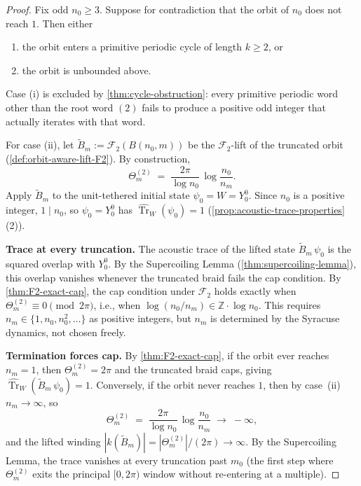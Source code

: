 \documentclass[11pt,a4paper]{article}
\theoremstyle{plain}
\theoremstyle{definition}
\theoremstyle{remark}
\numberwithin{equation}{section}
\newcommand{\Z}{\mathbb{Z}}
\DeclareMathOperator{\Tr}{Tr}
\begin{document}
\begin{proof}
Fix odd $n_0\ge 3$.  Suppose for contradiction that the orbit of
$n_0$ does not reach $1$.  Then either
\begin{enumerate}
  \item[(i)] the orbit enters a primitive periodic cycle of length
        $k\ge 2$, or
  \item[(ii)] the orbit is unbounded above.
\end{enumerate}
Case (i) is excluded by \cref{thm:cycle-obstruction}: every
primitive periodic word other than the root word $(2)$ fails to
produce a positive odd integer that actually iterates with that
word.

For case (ii), let $\widetilde B_m:=\mathcal{F}_2(B(n_0,m))$ be the
$\mathcal{F}_2$-lift of the truncated orbit
(\cref{def:orbit-aware-lift-F2}).  By construction,
\[
  \Theta_m^{(2)}\;=\;\frac{2\pi}{\log n_0}\,\log\!\frac{n_0}{n_m}.
\]
Apply $\widetilde B_m$ to the unit-tethered initial state
$\psi_0=W=Y_0^0$.  Since $n_0$ is a positive integer, $1\mid n_0$,
so $\psi_0=Y_0^0$ has $\widehat{\Tr}_W(\psi_0)=1$
(\cref{prop:acoustic-trace-properties}(2)).

\textbf{Trace at every truncation.}  The acoustic trace of the
lifted state $\widetilde B_m\,\psi_0$ is the squared overlap with
$Y_0^0$.  By the Supercoiling Lemma
(\cref{thm:supercoiling-lemma}), this overlap vanishes whenever the
truncated braid fails the cap condition.  By
\cref{thm:F2-exact-cap}, the cap condition under $\mathcal{F}_2$
holds exactly when $\Theta_m^{(2)}\equiv 0\pmod{2\pi}$, i.e.,
when $\log(n_0/n_m)\in\Z\cdot\log n_0$.  This requires $n_m\in
\{1,n_0,n_0^2,\ldots\}$ as positive integers, but $n_m$ is determined
by the Syracuse dynamics, not chosen freely.

\textbf{Termination forces cap.}  By \cref{thm:F2-exact-cap}, if the
orbit ever reaches $n_m=1$, then $\Theta_m^{(2)}=2\pi$ and the
truncated braid caps, giving $\widehat{\Tr}_W(\widetilde B_m\,\psi_0)
=1$.  Conversely, if the orbit never reaches $1$, then by case~(ii)
$n_m\to\infty$, so
\[
  \Theta_m^{(2)}\;=\;\frac{2\pi}{\log n_0}\,\log\!\frac{n_0}{n_m}
  \;\longrightarrow\;-\infty,
\]
and the lifted winding $|k(\widetilde B_m)|=|\Theta_m^{(2)}|/(2\pi)
\to\infty$.  By the Supercoiling Lemma, the trace vanishes at every
truncation past $m_0$ (the first step where $\Theta_m^{(2)}$ exits
the principal $[0,2\pi)$ window without re-entering at a multiple).


\end{proof}
\end{document}
